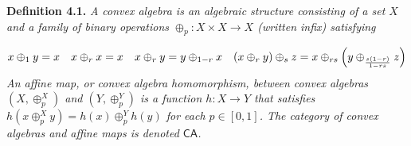 \documentclass[11pt,a4paper]{amsart}
\begin{document}
\par\medskip
\hypertarget{html:S4.Thmtheorem1}{} \par\noindent\textbf{\textbf{Definition 4.1}\textbf{.}}\quad  %
\hypertarget{html:S4.Thmtheorem1.p1}{} \emph{A \emph{convex algebra} is an algebraic structure consisting of a set %
\hypertarget{html:S4.Thmtheorem1.p1.m1}{}\({X}\) and a family of binary operations %
\hypertarget{html:S4.Thmtheorem1.p1.m2}{}\({\oplus_{p}\colon X\times X\to X}\) (written infix) satisfying}
\par\medskip
\hypertarget{html:S8.EGx5}{} %
\hypertarget{html:S4.Ex2}{}  %
\hypertarget{html:S4.Ex2.m1}{}\[\displaystyle x\oplus_{1}y=x\quad x\oplus_{r}x=x\quad x\oplus_{r}y=y\oplus_{1-r}x\quad(x\oplus_{r}y)\oplus_{s}z=x\oplus_{rs}\Big{(}y\oplus_{\frac{s(1-r)}{1-rs}}z\Big{)}\]    \emph{An \emph{affine map}, or \emph{convex algebra homomorphism}, between convex algebras %
\hypertarget{html:S4.Thmtheorem1.p1.m3}{}\({(X,\oplus^{X}_{p})}\) and %
\hypertarget{html:S4.Thmtheorem1.p1.m4}{}\({(Y,\oplus^{Y}_{p})}\) is a function %
\hypertarget{html:S4.Thmtheorem1.p1.m5}{}\({h\colon X\to Y}\) that satisfies %
\hypertarget{html:S4.Thmtheorem1.p1.m6}{}\({h(x\oplus^{X}_{p}y)=h(x)\oplus^{Y}_{p}h(y)}\) for each %
\hypertarget{html:S4.Thmtheorem1.p1.m7}{}\({p\in[0,1]}\). The category of convex algebras and affine maps is denoted %
\hypertarget{html:S4.Thmtheorem1.p1.m8}{}\({\mathsf{CA}}\).}
\par\medskip
\end{document}
